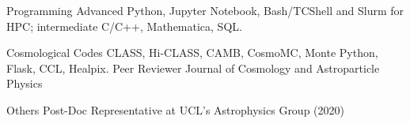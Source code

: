 

\begin{cvskills}

  \cvskill
    {Programming} %
    {Advanced Python, Jupyter Notebook, Bash/TCShell and Slurm for HPC; intermediate C/C++, Mathematica, SQL.} %

  \cvskill
    {Cosmological Codes} %
    {CLASS, Hi-CLASS, CAMB, CosmoMC, Monte Python, Flask, CCL, Healpix.} %
  \cvskill
    {Peer Reviewer} %
    {Journal of Cosmology and Astroparticle Physics}

\cvskill
    {Others} %
    {Post-Doc Representative at UCL's Astrophysics Group (2020)}
\end{cvskills}

